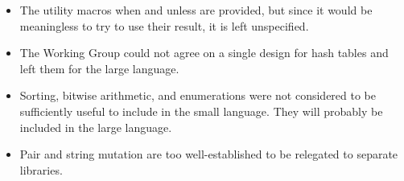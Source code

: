 \begin{itemize}
\item The utility macros {\cf when} and {\cf unless} are provided, but since it would be
meaningless to try to use their result, it is left unspecified.

\item The Working Group could not agree on a single design for hash tables and left them for
the large language. 

\item Sorting, bitwise arithmetic, and enumerations were not considered to be
sufficiently useful to include in the small language.  They will probably be
included in the large language.

\item Pair and string mutation are too well-established to be relegated to
separate libraries.

\end{itemize}

